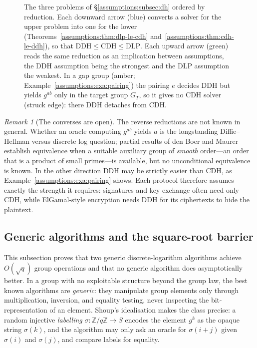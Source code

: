 \documentclass[11pt,a4paper]{article}
\theoremstyle{definition}
\theoremstyle{remark}
\newtheorem{remark}[theorem]{Remark}
\newcommand{\Z}{\ensuremath{\mathbb{Z}}}
\begin{document}
\begin{figure}[tp]
\caption{The three problems of \S\ref{assumptions:subsec:dh} ordered by
reduction. Each downward arrow (blue) converts a solver for the upper problem
into one for the lower (Theorems~\ref{assumptions:thm:dlp-le-cdh}
and~\ref{assumptions:thm:cdh-le-ddh}), so that
$\mathrm{DDH} \le \mathrm{CDH} \le \mathrm{DLP}$. Each upward arrow (green)
reads the same reduction as an implication between assumptions, the DDH
assumption being the strongest and the DLP assumption the weakest. In a gap
group (amber; Example~\ref{assumptions:exa:pairing}) the pairing $e$ decides
DDH but yields $g^{ab}$ only in the target group $G_T$, so it gives no CDH
solver (struck edge): there DDH detaches from CDH.}
\label{fig:dh-hierarchy}
\end{figure}

\begin{remark}[The converses are open]
\label{assumptions:rem:converse}
The reverse reductions are not known in general. Whether an oracle
computing \(g^{ab}\) yields \(a\) is the longstanding Diffie--Hellman
versus discrete log question; partial results of den Boer and Maurer establish
equivalence when a suitable auxiliary group of \emph{smooth}
order---an order that is a product of small primes---is available,
but no unconditional equivalence is known. In the other
direction DDH may be strictly easier than CDH, as
Example~\ref{assumptions:exa:pairing} shows. Each protocol therefore
assumes exactly the strength it requires: signatures and key exchange
often need only CDH, while ElGamal-style encryption needs DDH for its
ciphertexts to hide the plaintext.
\end{remark}

\subsection{Generic algorithms and the square-root barrier}
\label{assumptions:subsec:generic}

This subsection proves that two generic discrete-logarithm algorithms
achieve \(O(\sqrt q)\) group operations and that no generic algorithm
does asymptotically better. In a group with no exploitable structure
beyond the group law, the best known algorithms are \emph{generic}:
they manipulate group elements only through multiplication, inversion,
and equality testing, never inspecting the bit-representation of an
element. Shoup's idealisation makes the class precise: a random
injective \emph{labelling} \(\sigma \colon \Z/q\Z \to S\) encodes the
element \(g^{k}\) as the opaque string \(\sigma(k)\), and the algorithm
may only ask an oracle for \(\sigma(i + j)\) given \(\sigma(i)\) and
\(\sigma(j)\), and compare labels for equality.
\end{document}
